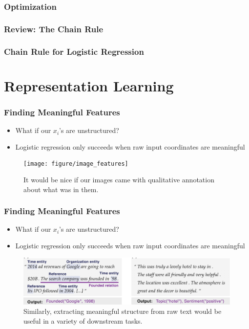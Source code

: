 \documentclass[10pt,mathserif]{beamer}
\begin{document}
\begin{frame}
  \frametitle{Optimization}
\end{frame}

\begin{frame}
  \frametitle{Review: The Chain Rule}
\end{frame}

\begin{frame}
  \frametitle{Chain Rule for Logistic Regression}
\end{frame}

\section{Representation Learning}

\begin{frame}
  \frametitle{Finding Meaningful Features}
 \begin{itemize}
 \item What if our $x_i$'s are unstructured?
 \item Logistic regression only succeeds when raw input coordinates are
   meaningful
 \end{itemize} 
 \begin{figure}[ht]
   \centering
   \texttt{[image: figure/image\_features]}
   \caption{It would be nice if our images came with qualitative annotation
     about what was in them. \label{fig:image_features} }
 \end{figure}
\end{frame}

\begin{frame}
  \frametitle{Finding Meaningful Features}
 \begin{itemize}
 \item What if our $x_i$'s are unstructured?
 \item Logistic regression only succeeds when raw input coordinates are
   meaningful
 \end{itemize} 
 \begin{figure}[ht]
   \centering
   \includegraphics[width=0.7\paperwidth]{figure/language_features}
   \caption{Similarly, extracting meaningful structure from raw text would be
     useful in a variety of downstream tasks. \label{fig:language_features} }
 \end{figure}
\end{frame}
\end{document}
